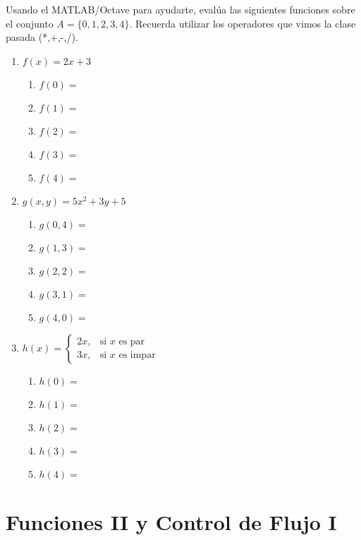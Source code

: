 \documentclass[spanish, 10pt]{article}
\begin{document}
Usando el MATLAB/Octave para ayudarte, evalúa las siguientes funciones sobre el conjunto $A = \{0,1,2,3,4\}$.
Recuerda utilizar los operadores que vimos la clase pasada (*,+,-,/).
\begin{multicols}{2}
    \begin{enumerate}
        \item $f(x) = 2x + 3$
        \begin{enumerate}
            \item $f(0) =$
            \item $f(1) =$
            \item $f(2) =$
            \item $f(3) =$
            \item $f(4) =$
        \end{enumerate}
        \item $g(x,y) = 5x^2 + 3y + 5$
        \begin{enumerate}
            \item $g(0,4) =$
            \item $g(1,3) =$
            \item $g(2,2) =$
            \item $g(3,1) =$
            \item $g(4,0) =$
        \end{enumerate}
        
        \columnbreak

        \item $h(x) =
            \begin{cases}
                2x, & \text{si } x \text{ es par} \\
                3x, & \text{si } x \text{ es impar}
            \end{cases}$
        \begin{enumerate}
            \item $h(0) =$
            \item $h(1) =$
            \item $h(2) =$
            \item $h(3) =$
            \item $h(4) =$
        \end{enumerate}
    \end{enumerate}
\end{multicols}

\section{Funciones II y Control de Flujo I}
\end{document}
